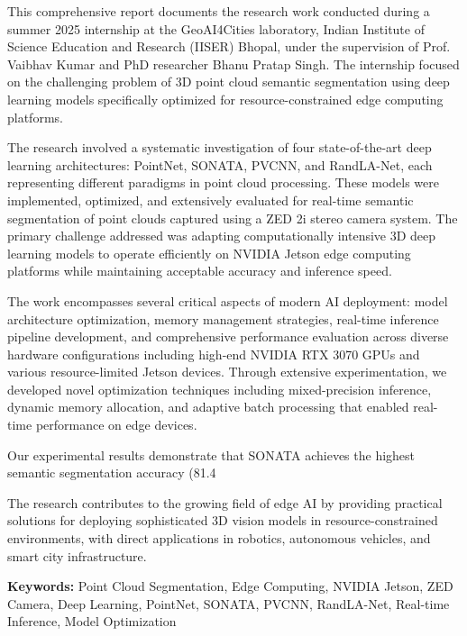 \documentclass[12pt,a4paper]{report}
\begin{document}
This comprehensive report documents the research work conducted during a summer 2025 internship at the GeoAI4Cities laboratory, Indian Institute of Science Education and Research (IISER) Bhopal, under the supervision of Prof. Vaibhav Kumar and PhD researcher Bhanu Pratap Singh. The internship focused on the challenging problem of 3D point cloud semantic segmentation using deep learning models specifically optimized for resource-constrained edge computing platforms.

The research involved a systematic investigation of four state-of-the-art deep learning architectures: PointNet, SONATA, PVCNN, and RandLA-Net, each representing different paradigms in point cloud processing. These models were implemented, optimized, and extensively evaluated for real-time semantic segmentation of point clouds captured using a ZED 2i stereo camera system. The primary challenge addressed was adapting computationally intensive 3D deep learning models to operate efficiently on NVIDIA Jetson edge computing platforms while maintaining acceptable accuracy and inference speed.

The work encompasses several critical aspects of modern AI deployment: model architecture optimization, memory management strategies, real-time inference pipeline development, and comprehensive performance evaluation across diverse hardware configurations including high-end NVIDIA RTX 3070 GPUs and various resource-limited Jetson devices. Through extensive experimentation, we developed novel optimization techniques including mixed-precision inference, dynamic memory allocation, and adaptive batch processing that enabled real-time performance on edge devices.

Our experimental results demonstrate that SONATA achieves the highest semantic segmentation accuracy (81.4%

The research contributes to the growing field of edge AI by providing practical solutions for deploying sophisticated 3D vision models in resource-constrained environments, with direct applications in robotics, autonomous vehicles, and smart city infrastructure.

\textbf{Keywords:} Point Cloud Segmentation, Edge Computing, NVIDIA Jetson, ZED Camera, Deep Learning, PointNet, SONATA, PVCNN, RandLA-Net, Real-time Inference, Model Optimization
\end{document}

